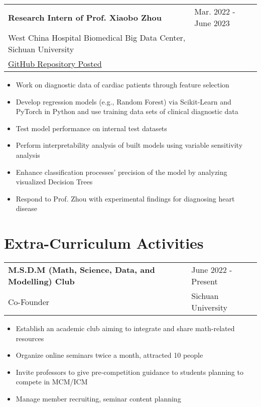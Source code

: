 \documentclass[letter,12pt]{article}
\begin{document}
\begin{tabularx}{\linewidth}{@{}l X@{}}
\large \textbf{Research Intern of Prof. Xiaobo Zhou} & \hfill {Mar. 2022 - June 2023} \\
\small{West China Hospital Biomedical Big Data Center, Sichuan University} & \hfill {} \\
\small{\href{https://github.com/Robin0265/HeartDisease_Regression}{GitHub Repository Posted}} & \hfill {} \\
\end{tabularx}

\begin{itemize}[
    rightmargin=2cm
]
    \setlength{\itemsep}{1pt}
    \setlength{\parskip}{0pt}
    \setlength{\parsep}{0pt}
    \item{\small Work on diagnostic data of cardiac patients through feature selection}
    \item{\small Develop regression models (e.g., Random Forest) via Scikit-Learn and PyTorch in Python and use training data sets of clinical diagnostic data}
    \item{\small Test model performance on internal test datasets}
    \item{\small Perform interpretability analysis of built models using variable sensitivity analysis}
    \item{\small Enhance classification processes' precision of the model by analyzing visualized Decision Trees}
    \item{\small Respond to Prof. Zhou with experimental findings for diagnosing heart disease}
\end{itemize}


\section{Extra-Curriculum Activities}

\begin{tabularx}{\linewidth}{@{}l X@{}}
\large \textbf{M.S.D.M (Math, Science, Data, and Modelling) Club} & \hfill {June 2022 - Present} \\
\normalsize{Co-Founder} & \hfill \small{Sichuan University} \\
\end{tabularx}

\begin{itemize}[
    rightmargin=2cm
]
    \setlength{\itemsep}{1pt}
    \setlength{\parskip}{0pt}
    \setlength{\parsep}{0pt}
    \item{\small Establish an academic club aiming to integrate and share math-related resources}
    \item{\small Organize online seminars twice a month, attracted 10 people}
    \item{\small Invite professors to give pre-competition guidance to students planning to compete in MCM/ICM}
    \item{\small Manage member recruiting, seminar content planning}
\end{itemize}
\end{document}
